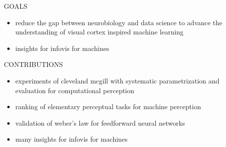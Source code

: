 GOALS
\begin{itemize}
	\item reduce the gap between neurobiology and data science to advance the understanding of visual cortex inspired machine learning
	\item insights for infovis for machines
\end{itemize}

CONTRIBUTIONS
\begin{itemize}
	\item experiments of cleveland mcgill with systematic parametrization and evaluation for computational perception
	\item ranking of elementary perceptual tasks for machine perception
	\item validation of weber's law for feedforward neural networks
	\item many insights for infovis for machines
\end{itemize}


